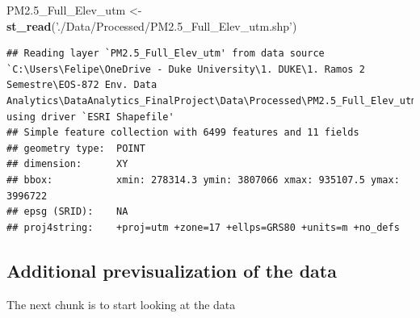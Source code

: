\documentclass[12pt,]{article}
\newenvironment{Shaded}{\begin{snugshade}}{\end{snugshade}}
\newcommand{\KeywordTok}[1]{\textcolor[rgb]{0.13,0.29,0.53}{\textbf{#1}}}
\newcommand{\StringTok}[1]{\textcolor[rgb]{0.31,0.60,0.02}{#1}}
\newcommand{\NormalTok}[1]{#1}
\begin{document}
\begin{Shaded}
\begin{Highlighting}[]
\NormalTok{PM2.5_Full_Elev_utm <-}\StringTok{ }\KeywordTok{st_read}\NormalTok{(}\StringTok{'./Data/Processed/PM2.5_Full_Elev_utm.shp'}\NormalTok{) }
\end{Highlighting}
\end{Shaded}

\begin{verbatim}
## Reading layer `PM2.5_Full_Elev_utm' from data source `C:\Users\Felipe\OneDrive - Duke University\1. DUKE\1. Ramos 2 Semestre\EOS-872 Env. Data Analytics\DataAnalytics_FinalProject\Data\Processed\PM2.5_Full_Elev_utm.shp' using driver `ESRI Shapefile'
## Simple feature collection with 6499 features and 11 fields
## geometry type:  POINT
## dimension:      XY
## bbox:           xmin: 278314.3 ymin: 3807066 xmax: 935107.5 ymax: 3996722
## epsg (SRID):    NA
## proj4string:    +proj=utm +zone=17 +ellps=GRS80 +units=m +no_defs
\end{verbatim}

\subsection{Additional previsualization of the
data}\label{additional-previsualization-of-the-data}

The next chunk is to start looking at the data
\end{document}
